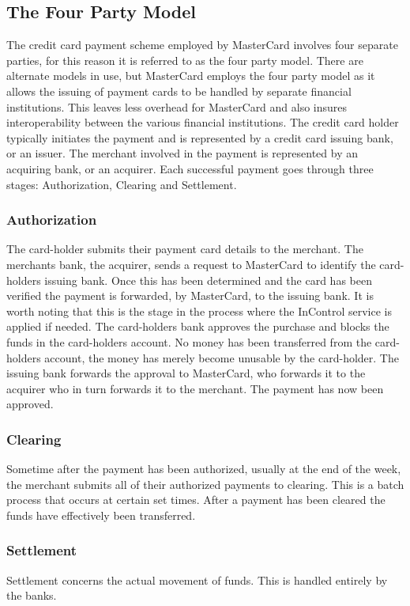 \documentclass[a4paper, 11pt, titlepage]{article}
\begin{document}
\subsection{The Four Party Model} 
The credit card payment scheme employed by MasterCard involves four separate parties, for this reason it is referred to as the four party model. There are alternate models in use, but MasterCard employs the four party model as it allows the issuing of payment cards to be handled by separate financial institutions. This leaves less overhead for MasterCard and also insures interoperability between the various financial institutions. The credit card holder typically initiates the payment and is represented by a credit card issuing bank, or an issuer. The merchant involved in the payment is represented by an acquiring bank, or an acquirer. Each successful payment goes through three stages: Authorization, Clearing and Settlement. 
\subsubsection{Authorization} The card-holder submits their payment card details to the merchant. The merchants bank, the acquirer, sends a request to MasterCard to identify the card-holders issuing bank. Once this has been determined and the card has been verified the payment is forwarded, by MasterCard, to the issuing bank. It is worth noting that this is the stage in the process where the InControl service is applied if needed. The card-holders bank approves the purchase and blocks the funds in the card-holders account. No money has been transferred from the card-holders account, the money has merely become unusable by the card-holder. The issuing bank forwards the approval to MasterCard, who forwards it to the acquirer who in turn forwards it to the merchant. The payment has now been approved.  
\subsubsection{Clearing} Sometime after the payment has been authorized, usually at the end of the week, the merchant submits all of their authorized payments to clearing. This is a batch process that occurs at certain set times. After a payment has been cleared the funds have effectively been transferred. 
\subsubsection{Settlement} Settlement concerns the actual movement of funds. This is handled entirely by the banks.
\end{document}
